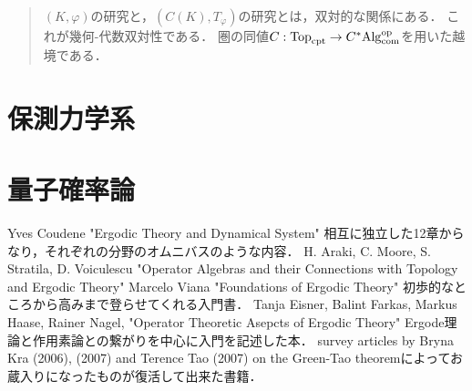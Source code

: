 \documentclass[uplatex,dvipdfmx]{jsreport}
\begin{document}
\begin{quotation}
    $(K,\varphi)$の研究と，$(C(K),T_\varphi)$の研究とは，双対的な関係にある．
    これが幾何-代数双対性である．
    圏の同値$C:\mathrm{Top}_{\mathrm{cpt}}\to C^*\mathrm{Alg}^{\mathrm{op}}_{\mathrm{com}}$を用いた越境である．
\end{quotation}

\chapter{保測力学系}

\chapter{量子確率論}

\begin{thebibliography}{9}
    Yves Coudene "Ergodic Theory and Dynamical System"
    相互に独立した12章からなり，それぞれの分野のオムニバスのような内容．
    H. Araki, C. Moore, S. Stratila, D. Voiculescu "Operator Algebras and their Connections with Topology and Ergodic Theory"
    Marcelo Viana "Foundations of Ergodic Theory"
    初歩的なところから高みまで登らせてくれる入門書．
    Tanja Eisner, Balint Farkas, Markus Haase, Rainer Nagel, "Operator Theoretic Asepcts of Ergodic Theory"
    Ergode理論と作用素論との繋がりを中心に入門を記述した本．
    survey articles by Bryna Kra (2006), (2007) and Terence Tao (2007) on the Green-Tao theoremによってお蔵入りになったものが復活して出来た書籍．
\end{thebibliography}
\end{document}
